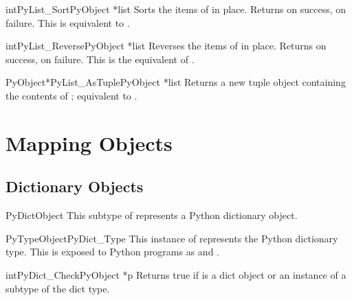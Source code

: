 \begin{cfuncdesc}{int}{PyList_Sort}{PyObject *list}
  Sorts the items of  in place.  Returns  on
  success,  on failure.  This is equivalent to
  .
\end{cfuncdesc}

\begin{cfuncdesc}{int}{PyList_Reverse}{PyObject *list}
  Reverses the items of  in place.  Returns  on
  success,  on failure.  This is the equivalent of
  .
\end{cfuncdesc}

\begin{cfuncdesc}{PyObject*}{PyList_AsTuple}{PyObject *list}
  Returns a new tuple object containing the contents of ;
  equivalent to .
\end{cfuncdesc}


\section{Mapping Objects \label{mapObjects}}



\subsection{Dictionary Objects \label{dictObjects}}

\begin{ctypedesc}{PyDictObject}
  This subtype of  represents a Python dictionary
  object.
\end{ctypedesc}

\begin{cvardesc}{PyTypeObject}{PyDict_Type}
  This instance of  represents the Python
  dictionary type.  This is exposed to Python programs as
   and .
\end{cvardesc}

\begin{cfuncdesc}{int}{PyDict_Check}{PyObject *p}
  Returns true if  is a dict object or an instance of a
  subtype of the dict type.
\end{cfuncdesc}

